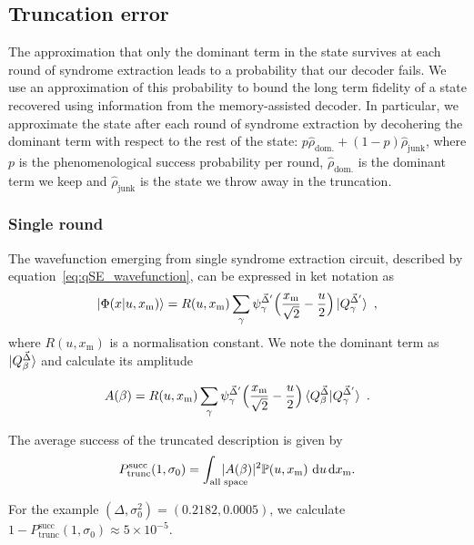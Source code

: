 \documentclass[prx,reprint,superscriptaddress,longbibliography,floatfix,nofootinbib]{revtex4-1}
\begin{document}
\subsection{Truncation error}
The approximation that only the dominant term in the state survives at each round of syndrome extraction leads to a probability that our decoder fails. We use an approximation of this probability to bound the long term fidelity of a state recovered using information from the memory-assisted decoder. In particular, we approximate the state after each round of syndrome extraction by decohering the dominant term with respect to the rest of the state: $p\hat{\rho}_\text{dom.} + (1-p)\hat{\rho}_\text{junk}$, where $p$ is the phenomenological success probability per round, $\hat{\rho}_\text{dom.}$ is the dominant term we keep and $\hat{\rho}_\text{junk}$ is the state we throw away in the truncation.

\subsubsection{Single round}
The wavefunction emerging from single syndrome extraction circuit, described by equation~\ref{eq:qSE_wavefunction}, can be expressed in ket notation as
\begin{equation}
\ket{\Phi(x|u,x_\text{m})} = R(u,x_\text{m}) \sum_{\gamma} \psi_{\gamma}^{\vec{\Delta}'} \Big{(}\frac{x_\text{m}}{\sqrt{2}}-\frac{u}{2}\Big{)} \ket{Q_\gamma^{\vec{\Delta}'}} \ ,
\end{equation}
\noindent where $R(u,x_\text{m})$ is a normalisation constant. We note the dominant term as $\ket{Q_\beta^{\vec{\Delta}}}$ and calculate its amplitude 

\begin{equation}
    A(\beta) = R(u,x_\text{m})\sum_{\gamma} \psi_{\gamma}^{\vec{\Delta}'} \Big(\frac{x_\text{m}}{\sqrt{2}}-\frac{u}{2}\Big) \braket{Q_{\beta}^{\vec{\Delta}}|Q_{\gamma}^{\vec{\Delta}'}} \ .
\end{equation}

The average success of the truncated description is given by 
\begin{equation}
    P^{\text{succ}}_{\text{trunc}}(1,\sigma_0)  = \int_{\text{all\ space}}  \hspace{-0.8cm}|A(\beta)|^2 \mathbb{P}(u,x_\text{m}) \ \text{d}u \hspace{0.05cm} \text{d}x_\text{m}.
\end{equation}

For the example $(\Delta,\sigma_0^2) = (0.2182,0.0005)$, we calculate $1-P^{\text{succ}}_{\text{trunc}}(1,\sigma_0) \approx 5\times 10^{-5}$.
\end{document}
